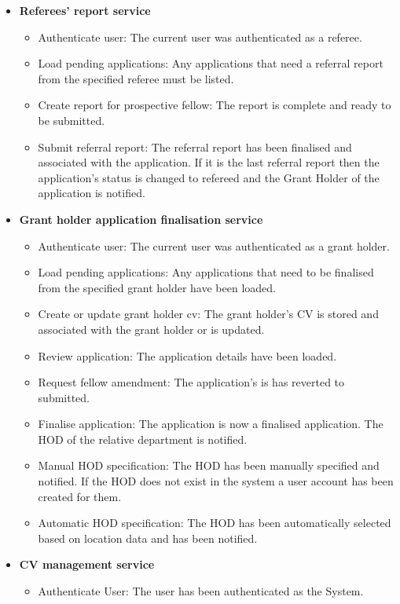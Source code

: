\documentclass[12pt]{article}
\begin{document}
\begin{itemize}
	\item \textbf{Referees' report service}
		\begin{itemize}
			\item Authenticate user: The current user was authenticated as a referee.
			\item Load pending applications: Any applications that need a referral report from the specified referee must be listed.
			\item Create report for prospective fellow: The report is complete and ready to be submitted.				
			\item Submit referral report: The referral report has been finalised and associated with the application. If it is the last referral report then the application's status is changed to refereed and the Grant Holder of the application is notified.									
		\end{itemize}
	\item \textbf{Grant holder application finalisation service}
		\begin{itemize}
			\item Authenticate user: The current user was authenticated as a grant holder.
			\item Load pending applications: Any applications that need to be finalised from the specified grant holder have been loaded.			
			\item Create or update grant holder cv: The grant holder's CV is stored and associated with the grant holder or is updated.
			\item Review application: The application details have been loaded.
			\item Request fellow amendment: The application's is has reverted to submitted.
			\item Finalise application: The application is now a finalised application. The HOD of the relative department is notified. 
			\item Manual HOD specification: The HOD has been manually specified and notified. If the HOD does not exist in the system a user account has been created for them.
			\item Automatic HOD specification: The HOD has been automatically selected based on location data and has been notified.									
		\end{itemize}
	\item \textbf{CV management service}
			\begin{itemize}
				\item Authenticate User: The user has been authenticated as the System.

\end{itemize}
\end{itemize}
\end{document}
